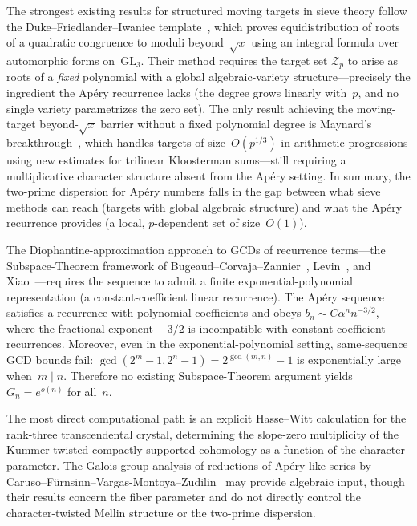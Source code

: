 \documentclass[11pt]{article}
\theoremstyle{definition}
\theoremstyle{remark}
\begin{document}
The strongest existing results for
structured moving targets in sieve theory
follow the Duke--Friedlander--Iwaniec
template~\cite{DFI1995}, which proves
equidistribution of roots of a quadratic
congruence to moduli beyond~$\sqrt{x}$
using an integral formula over
automorphic forms on~$\mathrm{GL}_3$.
Their method requires the target set
$\mathcal{Z}_p$ to arise as roots of a
\emph{fixed} polynomial with a global
algebraic-variety structure---precisely
the ingredient the Ap\'ery recurrence
lacks (the degree grows linearly
with~$p$, and no single variety
parametrizes the zero set).
The only result achieving the moving-target
beyond-$\!\sqrt{x}$ barrier without a fixed
polynomial degree is Maynard's
breakthrough~\cite{Maynard2020},
which handles targets of size~$O(p^{1/3})$
in arithmetic progressions using new estimates
for trilinear Kloosterman sums---still
requiring a multiplicative character
structure absent from the Ap\'ery setting.
In summary, the two-prime dispersion
for Ap\'ery numbers falls in the gap
between what sieve methods can reach
(targets with global algebraic structure)
and what the Ap\'ery recurrence provides
(a local, $p$-dependent set of size~$O(1)$).

The Diophantine-approximation approach to GCDs of
recurrence terms---the Subspace-Theorem framework
of Bugeaud--Corvaja--Zannier~\cite{BCZ2003},
Levin~\cite{Levin2019}, and
Xiao~\cite{Xiao2024}---requires the sequence
to admit a finite exponential-polynomial
representation (a constant-coefficient
linear recurrence).
The Ap\'ery sequence satisfies a recurrence
with polynomial coefficients and obeys
$b_n \sim C\alpha^n n^{-3/2}$, where
the fractional exponent~$-3/2$ is
incompatible with constant-coefficient
recurrences.
Moreover, even in the exponential-polynomial
setting, same-sequence GCD bounds fail:
$\gcd(2^m{-}1, 2^n{-}1) = 2^{\gcd(m,n)}{-}1$
is exponentially large when~$m \mid n$.
Therefore no existing Subspace-Theorem
argument yields $G_n = e^{o(n)}$ for all~$n$.

The most direct computational path
is an explicit Hasse--Witt calculation
for the rank-three transcendental
crystal, determining the slope-zero
multiplicity of the Kummer-twisted
compactly supported cohomology
as a function of the character parameter.
The Galois-group analysis of reductions
of Ap\'ery-like series by
Caruso--F\"urnsinn--Vargas-Montoya--Zudilin~\cite{CFVZ2026}
may provide algebraic input, though
their results concern the fiber
parameter and do not directly control
the character-twisted Mellin structure
or the two-prime dispersion.
\end{document}
